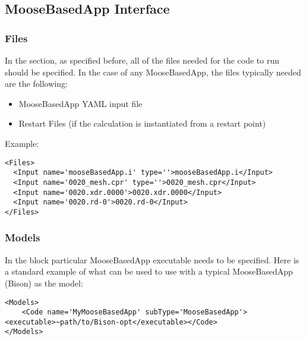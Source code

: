 \subsection{MooseBasedApp Interface}
\subsubsection{Files}
In the  section, as specified before, all of the files needed for
the code to run should be specified.
%
In the case of any MooseBasedApp, the files typically needed are the following:
\begin{itemize}
  \item MooseBasedApp YAML input file
  \item Restart Files (if the calculation is instantiated from a restart point)
\end{itemize}
Example:
\begin{lstlisting}[style=XML]
<Files>
  <Input name='mooseBasedApp.i' type=''>mooseBasedApp.i</Input>
  <Input name='0020_mesh.cpr' type=''>0020_mesh.cpr</Input>
  <Input name='0020.xdr.0000'>0020.xdr.0000</Input>
  <Input name='0020.rd-0'>0020.rd-0</Input>
</Files>
\end{lstlisting}
\subsubsection{Models}
In the  block particular MooseBasedApp executable needs to be specified.
%
Here is a standard example of what can be used to use with a typical MooseBasedApp (Bison) as the model:
\begin{lstlisting}[style=XML]
<Models>
    <Code name='MyMooseBasedApp' subType='MooseBasedApp'><executable>~path/to/Bison-opt</executable></Code>
</Models>
\end{lstlisting}
